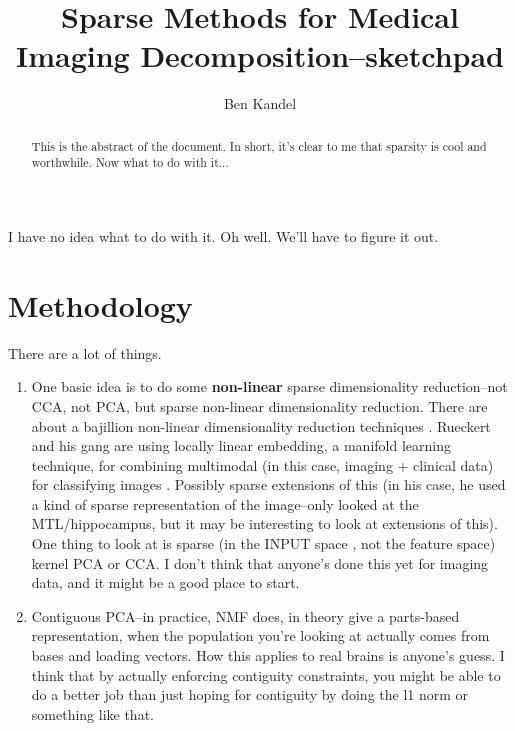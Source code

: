 \documentclass{nih}
\author{Ben Kandel}
\title{Sparse Methods for Medical Imaging Decomposition--sketchpad}
\begin{document}
\maketitle
\begin{abstract}
This is the abstract of the document.  In short, it's clear to me that sparsity is cool and worthwhile.  Now what to do with it...
\end{abstract}
I have no idea what to do with it. Oh well.  We'll have to figure it out. 

\section{Methodology}
There are a lot of things.  
\begin{enumerate}
\item One basic idea is to do some \textbf{non-linear} sparse dimensionality reduction--not CCA, not PCA, but sparse non-linear dimensionality reduction.  There are about a bajillion non-linear dimensionality reduction techniques \cite{van_der_maaten_dimensionality_2007}.  Rueckert and his gang are using locally linear embedding, a manifold learning technique, for combining multimodal (in this case, imaging + clinical data) for classifying images \cite{wolz_nonlinear_2012}.  Possibly sparse extensions of this (in his case, he used a kind of sparse representation of the image--only looked at the MTL/hippocampus, but it may be interesting to look at extensions of this).  One thing to look at is sparse (in the INPUT space \cite{scholkopf_input_1999}, not the feature space) kernel PCA or CCA.  I don't think that anyone's done this yet for imaging data, and it might be a good place to start. 
\item Contiguous PCA--in practice, NMF does, in theory \cite{donoho_when_2004} give a parts-based representation, when the population you're looking at actually comes from bases and loading vectors.  How this applies to real brains is anyone's guess.  I think that by actually enforcing contiguity constraints, you might be able to do a better job than just hoping for contiguity by doing the l1 norm or something like that. 

\end{enumerate}
\end{document}
